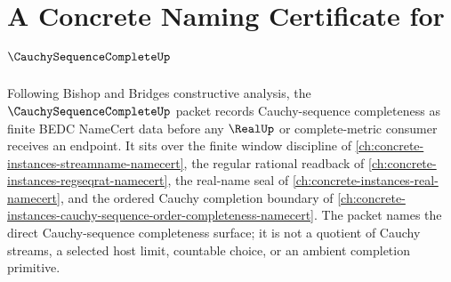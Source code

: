 \chapter{A Concrete Naming Certificate for $\CauchySequenceCompleteUp$}
\label{ch:concrete-instances-cauchy-sequence-complete-namecert}

Following Bishop and Bridges constructive analysis, the $\CauchySequenceCompleteUp$ packet records Cauchy-sequence completeness as finite BEDC NameCert data before any $\RealUp$ or complete-metric consumer receives an endpoint. It sits over the finite window discipline of \autoref{ch:concrete-instances-streamname-namecert}, the regular rational readback of \autoref{ch:concrete-instances-regseqrat-namecert}, the real-name seal of \autoref{ch:concrete-instances-real-namecert}, and the ordered Cauchy completion boundary of \autoref{ch:concrete-instances-cauchy-sequence-order-completeness-namecert}. The packet names the direct Cauchy-sequence completeness surface; it is not a quotient of Cauchy streams, a selected host limit, countable choice, or an ambient completion primitive.

